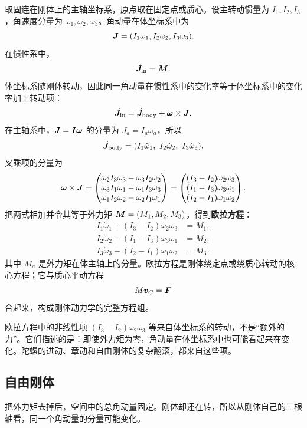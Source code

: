 取固连在刚体上的主轴坐标系，原点取在固定点或质心。设主转动惯量为 \(I_1,I_2,I_3\)，角速度分量为 \(\omega_1,\omega_2,\omega_3\)。角动量在体坐标系中为
\[
\boldsymbol{J}=(I_1\omega_1,I_2\omega_2,I_3\omega_3).
\]
在惯性系中，
\[
\dot{\boldsymbol{J}}_{\rm in}=\boldsymbol{M}.
\]
体坐标系随刚体转动，因此同一角动量在惯性系中的变化率等于体坐标系中的变化率加上转动项：
\[
\dot{\boldsymbol{J}}_{\rm in}
=\dot{\boldsymbol{J}}_{\rm body}+\boldsymbol{\omega}\times\boldsymbol{J}.
\]
在主轴系中，\(\boldsymbol{J}=\boldsymbol{I}\boldsymbol{\omega}\) 的分量为 \(J_a=I_a\omega_a\)，所以
\[
\dot{\boldsymbol{J}}_{\rm body}
=(I_1\dot\omega_1,\ I_2\dot\omega_2,\ I_3\dot\omega_3).
\]
叉乘项的分量为
\[
\boldsymbol{\omega}\times\boldsymbol{J}=
\begin{pmatrix}
\omega_2 I_3\omega_3-\omega_3 I_2\omega_2\\
\omega_3 I_1\omega_1-\omega_1 I_3\omega_3\\
\omega_1 I_2\omega_2-\omega_2 I_1\omega_1
\end{pmatrix}
=
\begin{pmatrix}
(I_3-I_2)\omega_2\omega_3\\
(I_1-I_3)\omega_3\omega_1\\
(I_2-I_1)\omega_1\omega_2
\end{pmatrix}.
\]
把两式相加并令其等于外力矩 \(\boldsymbol{M}=(M_1,M_2,M_3)\)，得到\textbf{欧拉方程}：
\begin{equation}
\boxed{
\begin{aligned}
I_1\dot\omega_1+(I_3-I_2)\omega_2\omega_3&=M_1,\\
I_2\dot\omega_2+(I_1-I_3)\omega_3\omega_1&=M_2,\\
I_3\dot\omega_3+(I_2-I_1)\omega_1\omega_2&=M_3.
\end{aligned}}
\label{eq:euler-equations}
\end{equation}
其中 \(M_a\) 是外力矩在体主轴上的分量。欧拉方程是刚体绕定点或绕质心转动的核心方程；它与质心平动方程
\[
M\dot{\boldsymbol{v}}_C=\boldsymbol{F}
\]
合起来，构成刚体动力学的完整方程组。

\begin{remark}
欧拉方程中的非线性项 \((I_3-I_2)\omega_2\omega_3\) 等来自体坐标系的转动，不是“额外的力”。它们描述的是：即使外力矩为零，角动量在体坐标系中也可能看起来在变化。陀螺的进动、章动和自由刚体的复杂翻滚，都来自这些项。
\end{remark}

\subsection{自由刚体}

把外力矩去掉后，空间中的总角动量固定。刚体却还在转，所以从刚体自己的三根轴看，同一个角动量的分量可能变化。

